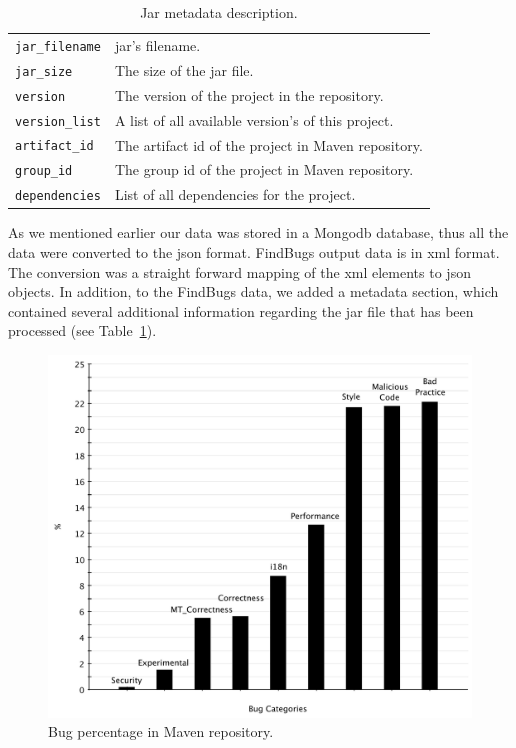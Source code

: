 \documentclass{sig-alternate}
\begin{document}
\begin{table}
\centering
\begin{tabular}{l p{5.0cm}}
 \hline
\verb|jar_filename| & {\sc jar}'s filename. \\
\verb|jar_size| & The size of the {\sc jar} file. \\
\verb|version| & The version of the project in the repository. \\
\verb|version_list| & A list of all available version's of this project. \\
\verb|artifact_id| & The artifact {\sc id} of the project in Maven repository. \\
\verb|group_id| & The group {\sc id} of the project in Maven repository. \\
\verb|dependencies| & List of all dependencies for the project. \\
 \hline
 \end{tabular}
\caption{Jar metadata description.}
\label{tbl:metadata-description}
\end{table}

As we mentioned earlier our data was stored in a
Mongo{\sc db} database, thus all the data were 
converted to the {\sc json} format. FindBugs output
data is in {\sc xml} format. The conversion was a
straight forward mapping
of the {\sc xml} elements to {\sc json} objects.
In addition, to the FindBugs data, we added a metadata
section, which contained
several additional information regarding the {\sc jar}
file that has been processed
(see Table~\ref{tbl:metadata-description}).

\begin{figure}[t]
	\centering
	\includegraphics[scale=0.32]{figures/bug_percent}
	\caption{Bug percentage in Maven repository.}
	\label{fig:bug-per} 
\end{figure}
\end{document}
